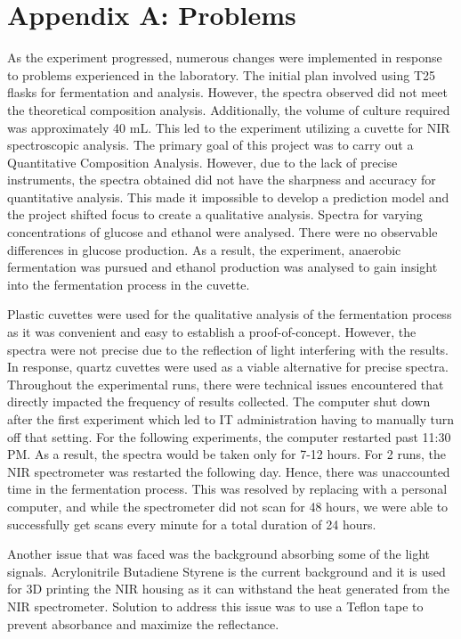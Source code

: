 \documentclass[12pt]{report}
\newcommand{\addappendix}[2]{
    \chapter*{Appendix #1: #2}
    \addcontentsline{toc}{section}{Appendix #1: #2}
}
\begin{document}
\newpage
\printbibliography %
\thispagestyle{empty}

\newpage
\appendix
\addappendix{A}{Problems}

As the experiment progressed, numerous changes were implemented in response to problems experienced in the laboratory. The initial plan involved using T25 flasks for fermentation and analysis. However, the spectra observed did not meet the theoretical composition analysis. Additionally, the volume of culture required was approximately 40 mL. This led to the experiment utilizing a cuvette for NIR spectroscopic analysis. The primary goal of this project was to carry out a Quantitative Composition Analysis. However, due to the lack of precise instruments, the spectra obtained did not have the sharpness and accuracy for quantitative analysis. This made it impossible to develop a prediction model and the project shifted focus to create a qualitative analysis. Spectra for varying concentrations of glucose and ethanol were analysed. There were no observable differences in glucose production. As a result, the experiment, anaerobic fermentation was pursued and ethanol production was analysed to gain insight into the fermentation process in the cuvette. 

Plastic cuvettes were used for the qualitative analysis of the fermentation process as it was convenient and easy to establish a proof-of-concept. However, the spectra were not precise due to the reflection of light interfering with the results. In response, quartz cuvettes were used as a viable alternative for precise spectra. Throughout the experimental runs, there were technical issues encountered that directly impacted the frequency of results collected. The computer shut down after the first experiment which led to IT administration having to manually turn off that setting. For the following experiments, the computer restarted past 11:30 PM. As a result, the spectra would be taken only for 7-12 hours. For 2 runs, the NIR spectrometer was restarted the following day. Hence, there was unaccounted time in the fermentation process. This was resolved by replacing with a personal computer, and while the spectrometer did not scan for 48 hours, we were able to successfully get scans every minute for a total duration of 24 hours.

Another issue that was faced was the background absorbing some of the light signals. Acrylonitrile Butadiene Styrene is the current background and it is used for 3D printing the NIR housing as it can withstand the heat generated from the NIR spectrometer. Solution to address this issue was to use a Teflon tape to prevent absorbance and maximize the reflectance.
\end{document}
